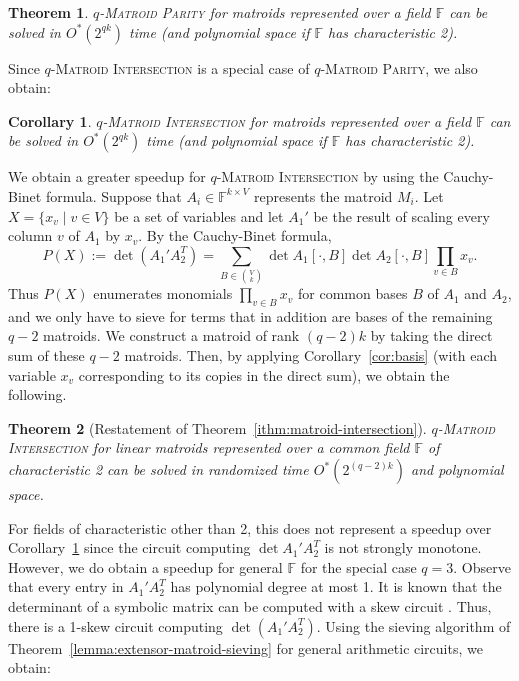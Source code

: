 \documentclass[10pt,a4paper]{article}
\newtheorem{theorem}{Theorem}[section]
\newtheorem{corollary}{Corollary}[section]
\newcommand{\F}{\ensuremath{\mathbb F}\xspace}
\begin{document}
\begin{theorem} \label{theorem:general-matroid-parity}
  \textsc{$q$-Matroid Parity} for matroids represented over a field $\F$ can be solved in $O^*(2^{qk})$ time (and polynomial space if $\F$ has characteristic 2).
\end{theorem}

Since \textsc{$q$-Matroid Intersection} is a special case of \textsc{$q$-Matroid Parity}, we also obtain:

\begin{corollary} \label{cor:general-matroid-parity}
   \textsc{$q$-Matroid Intersection} for matroids represented over a field $\F$ can be solved in $O^*(2^{qk})$ time (and polynomial space if $\F$ has characteristic 2).
\end{corollary}

We obtain a greater speedup for \textsc{$q$-Matroid Intersection} by using the Cauchy-Binet formula. 
Suppose that $A_i \in \F^{k \times V}$ represents the matroid $M_i$.
Let $X=\{x_v \mid v \in V\}$ be a set of variables and let $A_1'$ be
the result of scaling every column $v$ of $A_1$ by $x_v$.
By the Cauchy-Binet formula,
\[
  P(X) := \det (A_1' A_2^T) = \sum_{B \in \binom{V}{k}} \det
  A_1[\cdot,B] \det A_2[\cdot,B] \prod_{v \in B} x_v.
\]
Thus $P(X)$ enumerates monomials $\prod_{v \in B} x_v$ for
common bases $B$ of $A_1$ and $A_2$, and we only have to sieve for
terms that in addition are bases of the remaining $q-2$ matroids. 
We construct a matroid of rank $(q-2)k$ by taking the direct sum of these $q-2$ matroids. Then, by applying Corollary~\ref{cor:basis} (with each variable $x_v$ corresponding to its copies in the direct sum), we obtain the following.

\begin{theorem}[Restatement of Theorem~\ref{ithm:matroid-intersection}]
  \textsc{$q$-Matroid Intersection} for linear matroids represented
  over a common field $\F$ of characteristic 2 can be solved in
  randomized time $O^*(2^{(q-2)k})$ and polynomial space.
\end{theorem}

For fields of characteristic other than 2, this does not represent a speedup over Corollary~\ref{cor:general-matroid-parity}
since the circuit computing $\det A_1' A_2^T$ is not strongly monotone. 
However, we do obtain a speedup for general $\F$ for the special case $q=3$.
Observe that every entry in $A_1' A_2^T$ has polynomial degree at most 1.
It is known that the determinant of a symbolic matrix can be computed with a skew circuit \cite{MahajanV97}.
Thus, there is a 1-skew circuit computing $\det (A_1' A_2^T)$.
Using the sieving algorithm of Theorem~\ref{lemma:extensor-matroid-sieving} for general arithmetic circuits, we obtain:
\end{document}
